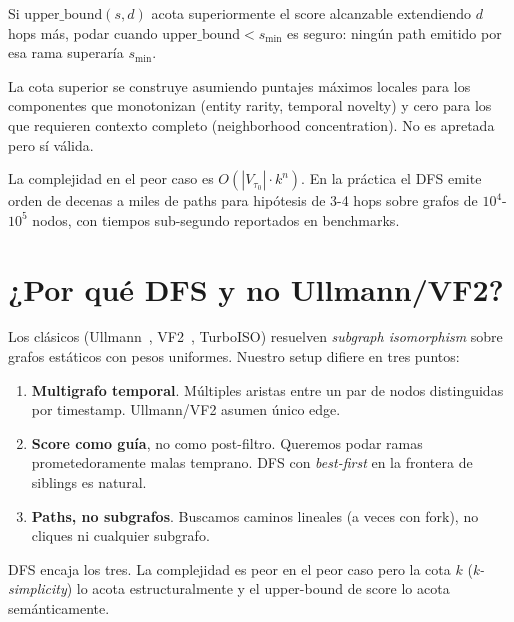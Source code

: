 \begin{lemma}
Si $\text{upper\_bound}(s, d)$ acota superiormente el score
alcanzable extendiendo $d$ hops más, podar cuando
$\text{upper\_bound} < s_{\min}$ es seguro: ningún path emitido por
esa rama superaría $s_{\min}$.
\end{lemma}

La cota superior se construye asumiendo puntajes máximos locales
para los componentes que monotonizan (entity rarity, temporal
novelty) y cero para los que requieren contexto completo
(neighborhood concentration). No es apretada pero sí válida.

La complejidad en el peor caso es
$O(|V_{\tau_0}| \cdot k^n)$. En la práctica el DFS emite orden de
decenas a miles de paths para hipótesis de 3-4 hops sobre grafos
de $10^4$-$10^5$ nodos, con tiempos sub-segundo reportados en
benchmarks.

\section{¿Por qué DFS y no Ullmann/VF2?}

Los clásicos (Ullmann~\cite{ullmann1976}, VF2~\cite{cordella2004vf2},
TurboISO) resuelven \emph{subgraph isomorphism} sobre grafos
estáticos con pesos uniformes. Nuestro setup difiere en tres
puntos:

\begin{enumerate}
    \item \textbf{Multigrafo temporal}. Múltiples aristas entre un
    par de nodos distinguidas por timestamp. Ullmann/VF2 asumen
    único edge.
    \item \textbf{Score como guía}, no como post-filtro. Queremos
    podar ramas prometedoramente malas temprano. DFS con
    \emph{best-first} en la frontera de siblings es natural.
    \item \textbf{Paths, no subgrafos}. Buscamos caminos lineales
    (a veces con fork), no cliques ni cualquier subgrafo.
\end{enumerate}

DFS encaja los tres. La complejidad es peor en el peor caso pero
la cota $k$ (\emph{k-simplicity}) lo acota estructuralmente y el
upper-bound de score lo acota semánticamente.
